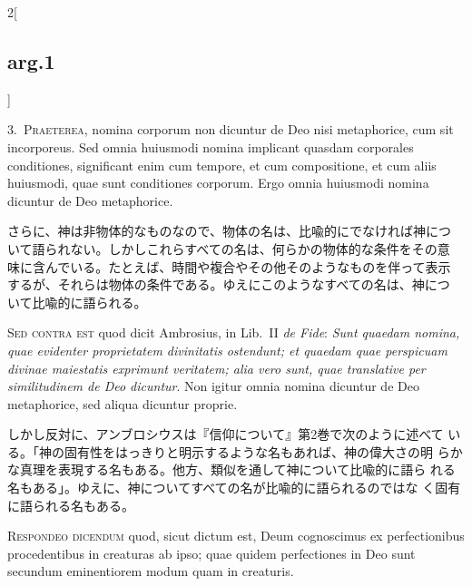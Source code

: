 \documentclass[paper=a4paper,fontsize=10pt,jafontsize=9pt,titlepage]{jlreq}
\begin{document}
\begin{paracol}{2}[\subsection{arg.1}]

3.~{\scshape Praeterea}, nomina corporum non dicuntur de Deo nisi
metaphorice, cum sit incorporeus. Sed omnia huiusmodi nomina implicant
quasdam corporales conditiones, significant enim cum tempore, et cum
compositione, et cum aliis huiusmodi, quae sunt conditiones
corporum. Ergo omnia huiusmodi nomina dicuntur de Deo metaphorice.

\switchcolumn

さらに、神は非物体的なものなので、物体の名は、比喩的にでなければ神につ
いて語られない。しかしこれらすべての名は、何らかの物体的な条件をその意
味に含んでいる。たとえば、時間や複合やその他そのようなものを伴って表示
するが、それらは物体の条件である。ゆえにこのようなすべての名は、神につ
いて比喩的に語られる。

\switchcolumn*[\subsection{s.c.}]

{\scshape Sed contra est} quod dicit Ambrosius, in Lib.\ II {\itshape de Fide}:
{\itshape Sunt quaedam nomina, quae evidenter proprietatem divinitatis
ostendunt; et quaedam quae perspicuam divinae maiestatis exprimunt
veritatem; alia vero sunt, quae translative per similitudinem de Deo
dicuntur}. Non igitur omnia nomina dicuntur de Deo metaphorice, sed
aliqua dicuntur proprie.

\switchcolumn

しかし反対に、アンブロシウスは『信仰について』第2巻で次のように述べて
いる。「神の固有性をはっきりと明示するような名もあれば、神の偉大さの明
らかな真理を表現する名もある。他方、類似を通して神について比喩的に語ら
れる名もある」。ゆえに、神についてすべての名が比喩的に語られるのではな
く固有に語られる名もある。


{\scshape Respondeo dicendum} quod, sicut dictum est, Deum cognoscimus ex
perfectionibus procedentibus in creaturas ab ipso; quae quidem
perfectiones in Deo sunt secundum eminentiorem modum quam in
 creaturis.

\switchcolumn


\end{paracol}
\end{document}
